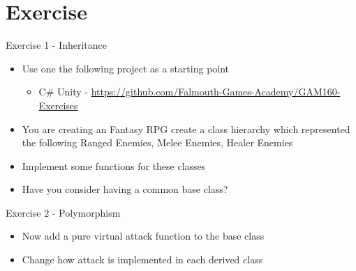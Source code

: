 \part{Exercise}
\frame{\partpage}

\begin{frame}{Exercise 1 - Inheritance}
	\begin{itemize}
		\item Use one the following project as a starting point
		\begin{itemize}
			\item C\# Unity - \url{https://github.com/Falmouth-Games-Academy/GAM160-Exercises}
		\end{itemize}
		\item You are creating an Fantasy RPG create a class hierarchy which represented the following Ranged Enemies, Melee Enemies, Healer Enemies
		\item Implement some functions for these classes
		\item Have you consider having a common base class?
	\end{itemize}
\end{frame}

\begin{frame}{Exercise 2 - Polymorphism}
	\begin{itemize}
		\item Now add a pure virtual attack function to the base class
		\item Change how attack is implemented in each derived class
	\end{itemize}
\end{frame}